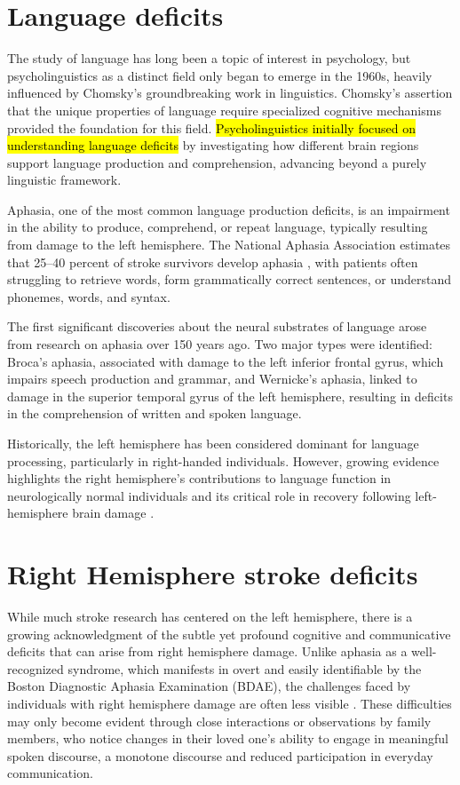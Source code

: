 \section{Language deficits}

The study of language has long been a topic of interest in psychology, but psycholinguistics as a distinct field only began to emerge in the 1960s, heavily influenced by Chomsky’s groundbreaking work in linguistics. Chomsky’s assertion that the unique properties of language require specialized cognitive mechanisms \cite{chomsky_linguistics_1991} provided the foundation for this field. 
\hl{Psycholinguistics initially focused on understanding language deficits} by investigating how different brain regions support language production and comprehension, advancing beyond a purely linguistic framework.

Aphasia, one of the most common language production deficits, is an impairment in the ability to produce, comprehend, or repeat language, typically resulting from damage to the left hemisphere. The National Aphasia Association estimates that 25–40 percent of stroke survivors develop aphasia \cite{kemmerer_cognitive_nodate}, with patients often struggling to retrieve words, form grammatically correct sentences, or understand phonemes, words, and syntax.

The first significant discoveries about the neural substrates of language arose from research on aphasia over 150 years ago. Two major types were identified: Broca's aphasia, associated with damage to the left inferior frontal gyrus, which impairs speech production and grammar, and Wernicke's aphasia, linked to damage in the superior temporal gyrus of the left hemisphere, resulting in deficits in the comprehension of written and spoken language.

Historically, the left hemisphere has been considered dominant for language processing, particularly in right-handed individuals. However, growing evidence highlights the right hemisphere's contributions to language function in neurologically normal individuals and its critical role in recovery following left-hemisphere brain damage \cite{kemmerer_cognitive_nodate}.

\section{Right Hemisphere stroke deficits} 
While much stroke research has centered on the left hemisphere, there is a growing acknowledgment of the subtle yet profound cognitive and communicative deficits that can arise from right hemisphere damage. Unlike aphasia as a well-recognized syndrome, which manifests in overt and easily identifiable by the Boston Diagnostic Aphasia Examination (BDAE), the challenges faced by individuals with right hemisphere damage are often less visible \cite{minga_apragmatism_2023}. These difficulties may only become evident through close interactions or observations by family members, who notice changes in their loved one’s ability to engage in meaningful spoken discourse, a monotone discourse and reduced participation in everyday communication.

